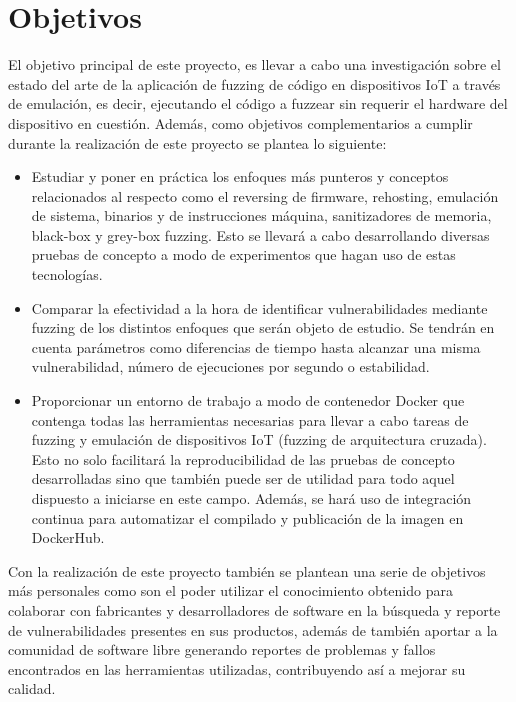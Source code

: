 \section{Objetivos}
El objetivo principal de este proyecto, es llevar a cabo una investigación sobre el estado del arte de la aplicación de fuzzing de código en dispositivos IoT
a través de emulación, es decir, ejecutando el código a fuzzear sin requerir el hardware del dispositivo en cuestión.
Además, como objetivos complementarios a cumplir durante la realización de este proyecto se plantea lo siguiente:
\begin{itemize}
    \item Estudiar y poner en práctica los enfoques más punteros y 
    conceptos relacionados al respecto como el reversing de firmware, rehosting, emulación de sistema, binarios y de instrucciones máquina, 
    sanitizadores de memoria, black-box y grey-box fuzzing. Esto se llevará a cabo desarrollando diversas pruebas de concepto a modo de 
    experimentos que hagan uso de estas tecnologías.
    \item Comparar la efectividad a la hora de identificar vulnerabilidades mediante fuzzing de los distintos enfoques que serán objeto de estudio. 
    Se tendrán en cuenta parámetros como diferencias de tiempo hasta alcanzar una misma vulnerabilidad, número de ejecuciones por segundo o estabilidad.
    \item Proporcionar un entorno de trabajo a modo de contenedor Docker que contenga todas las herramientas necesarias para llevar a cabo tareas de 
    fuzzing y emulación de dispositivos IoT (fuzzing de arquitectura cruzada). Esto no solo facilitará la reproducibilidad de las pruebas de 
    concepto desarrolladas sino que también puede ser de utilidad para todo aquel dispuesto a iniciarse en este campo. Además, se hará uso de 
    integración continua para automatizar el compilado y publicación de la imagen en DockerHub.
\end{itemize}

Con la realización de este proyecto también se plantean una serie de objetivos más personales como son el poder utilizar el conocimiento obtenido 
para colaborar con fabricantes y desarrolladores de software en la búsqueda y reporte de vulnerabilidades presentes en sus productos, además de también
aportar a la comunidad de software libre generando reportes de problemas y fallos encontrados en las herramientas utilizadas, contribuyendo así
a mejorar su calidad. 

